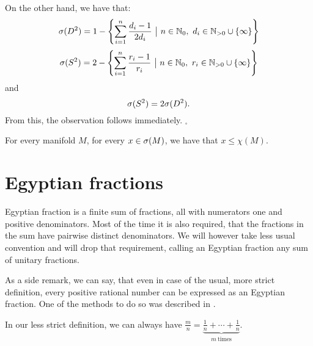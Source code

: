 On the other hand, we have that:
\begin{equation}
\speD = 1-\left\{\sum\limits_{i=1}^n\frac{d_i-1}{2d_i}\ 
\big|\ n\in\mathbb{N}_0,\ d_i\in\mathbb{N}_{>0}\cup \{\infty\}\right\}
\end{equation}
\begin{equation}
\speS = 2 - \left\{\sum\limits_{i=1}^n \frac{r_i-1}{r_i}\ \big|\ n\in\mathbb{N}_0,\ 
r_i\in\mathbb{N}_{>0}\cup \{\infty\}\right\}
\end{equation}
and
\begin{equation}
{{\sigma}(S^2)} = 2{{\sigma}(D^2)}.
\end{equation}
From this, the observation follows immediately. $_\square$

\begin{observation}\label{spectrum lesser than chi}
For every manifold $M$, for every $x \in {{\sigma}(M)}$, we have that $x \leq \chi(M)$.
\end{observation}


\section{Egyptian fractions}
Egyptian fraction is a finite sum of fractions, all with numerators one and positive denominators. 
Most of the time it is also required, that the fractions in the sum have pairwise distinct 
denominators. We will however take less usual convention and will drop that requirement, 
calling an Egyptian fraction any sum of unitary fractions. 

As a side remark, we can say, that even in case of the usual, more strict definition, 
every positive rational number can be expressed as an Egyptian fraction. One of the methods 
to do so was described in \cite{Engel1913}.

In our less strict definition, we can always have 
$\frac{m}{n} = \underbrace{\frac{1}{n}+\cdots+\frac{1}{n}}_{m\ \mathrm{times}}$.
